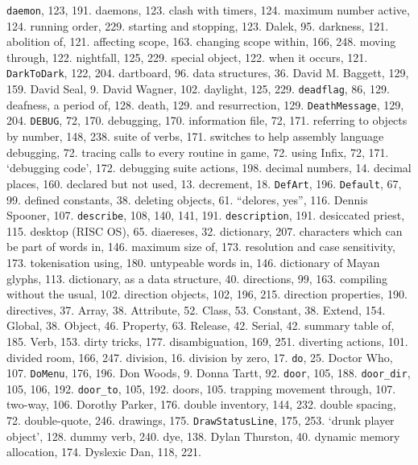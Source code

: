 {{\tt daemon}}, 123, 191.
daemons, 123.
\quad  clash with timers, 124.
\quad  maximum number active, 124.
\quad  running order, 229.
\quad  starting and stopping, 123.
Dalek, 95.
darkness, 121.
\quad  abolition of, 121.
\quad  affecting scope, 163.
\quad  changing scope within, 166, 248.
\quad  moving through, 122.
\quad  nightfall, 125, 229.
\quad  special object, 122.
\quad  when it occurs, 121.
{{\tt DarkToDark}}, 122, 204.
dartboard, 96.
data structures, 36.
David M. Baggett, 129, 159.
David Seal, 9.
David Wagner, 102.
daylight, 125, 229.
{{\tt deadflag}}, 86, 129.
deafness, a period of, 128.
death, 129.
\quad  and resurrection, 129.
{{\tt DeathMessage}}, 129, 204.
{{\tt DEBUG}}, 72, 170.
debugging, 170.
\quad  information file, 72, 171.
\quad  referring to objects by number, 148, 238.
\quad  suite of verbs, 171.
\quad  switches to help assembly language debugging, 72.
\quad  tracing calls to every routine in game, 72.
\quad  using Infix, 72, 171.
`debugging code', 172.
debugging suite actions, 198.
decimal numbers, 14.
decimal places, 160.
declared but not used, 13.
decrement, 18.
{{\tt DefArt}}, 196.
{{\tt Default}}, 67, 99.
defined constants, 38.
deleting objects, 61.
``delores, yes'', 116.
Dennis Spooner, 107.
{{\tt describe}}, 108, 140, 141, 191.
{{\tt description}}, 191.
desiccated priest, 115.
desktop (RISC OS), 65.
diaereses, 32.
dictionary, 207.
\quad  characters which can be part of words in, 146.
\quad  maximum size of, 173.
\quad  resolution and case sensitivity, 173.
\quad  tokenisation using, 180.
\quad  untypeable words in, 146.
dictionary of Mayan glyphs, 113.
dictionary, as a data structure, 40.
directions, 99, 163.
\quad  compiling without the usual, 102.
\quad  direction objects, 102, 196, 215.
\quad  direction properties, 190.
directives, 37.
\quad  Array, 38.
\quad  Attribute, 52.
\quad  Class, 53.
\quad  Constant, 38.
\quad  Extend, 154.
\quad  Global, 38.
\quad  Object, 46.
\quad  Property, 63.
\quad  Release, 42.
\quad  Serial, 42.
\quad  summary table of, 185.
\quad  Verb, 153.
dirty tricks, 177.
disambiguation, 169, 251.
diverting actions, 101.
divided room, 166, 247.
division, 16.
division by zero, 17.
{{\tt do}}, 25.
Doctor Who, 107.
{{\tt DoMenu}}, 176, 196.
Don Woods, 9.
Donna Tartt, 92.
{{\tt door}}, 105, 188.
{{\tt door\_dir}}, 105, 106, 192.
{{\tt door\_to}}, 105, 192.
doors, 105.
\quad  trapping movement through, 107.
\quad  two-way, 106.
Dorothy Parker, 176.
double inventory, 144, 232.
double spacing, 72.
double-quote, 246.
drawings, 175.
{{\tt DrawStatusLine}}, 175, 253.
`drunk player object', 128.
dummy verb, 240.
dye, 138.
Dylan Thurston, 40.
dynamic memory allocation, 174.
Dyslexic Dan, 118, 221.


